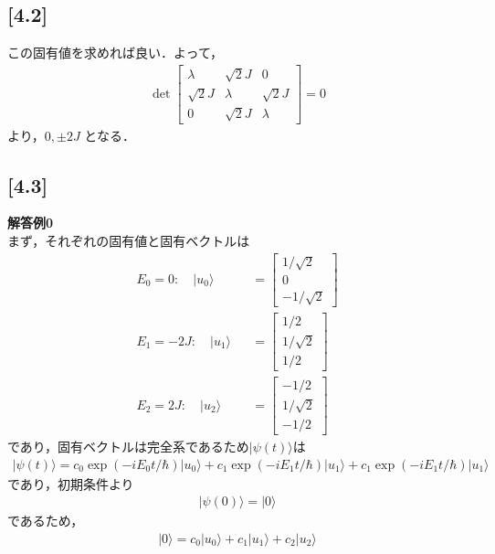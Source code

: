 \documentclass[12pt,dvipdfmx]{jsarticle}
\begin{document}
\subsection*{\large{[4.2]}}
この固有値を求めれば良い．よって，
\begin{eqnarray}
  \det
  \begin{bmatrix}
    \lambda & \sqrt{2}J & 0\\
    \sqrt{2}J & \lambda & \sqrt{2}J\\
    0 & \sqrt{2}J & \lambda
  \end{bmatrix}
  =0
\end{eqnarray}
より，$0,\pm 2J$
となる．

\subsection*{\large{[4.3]}}
\textbf{解答例0}\\
まず，それぞれの固有値と固有ベクトルは
\begin{eqnarray}
  E_0=0: \quad |u_0\rangle&&=
  \begin{bmatrix}
    1/\sqrt{2}\\
    0\\
    -1/\sqrt{2}
  \end{bmatrix}\\
  E_1=-2J: \quad |u_1\rangle&&=
  \begin{bmatrix}
    1/2\\
    1/\sqrt{2}\\
    1/2
  \end{bmatrix}\\
  E_2=2J: \quad |u_2\rangle&&=
  \begin{bmatrix}
    -1/2\\
    1/\sqrt{2}\\
    -1/2
  \end{bmatrix}
\end{eqnarray}
であり，固有ベクトルは完全系であるため$|\psi(t)\rangle$は
\begin{eqnarray}
  |\psi(t)\rangle = c_0\exp(-iE_0t/\hbar)|u_0\rangle + c_1\exp(-iE_1t/\hbar)|u_1\rangle +c_1\exp(-iE_1t/\hbar)|u_1\rangle
\end{eqnarray}
であり，初期条件より
\begin{eqnarray}
  |\psi(0)\rangle = |0\rangle
\end{eqnarray}
であるため，
\begin{eqnarray}
  |0\rangle = c_0|u_0\rangle+c_1|u_1\rangle+c_2|u_2\rangle
\end{eqnarray}
\end{document}
